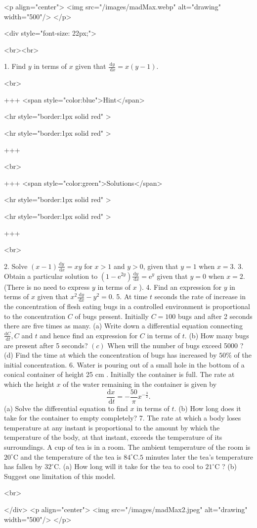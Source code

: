 <p align="center">
<img src="/images/madMax.webp" alt="drawing" width="500"/>
</p>

<div style="font-size: 22px;">

<br><br>

1. Find $y$ in terms of $x$ given that $\frac{\mathrm{d} y}{\mathrm{~d} x}=x(y-1)$.

<br>

+++ <span style="color:blue">Hint</span>

<hr style="border:1px solid red" >

<hr style="border:1px solid red" >

+++

<br>

+++ <span style="color:green">Solutions</span>

<hr style="border:1px solid red" >

<hr style="border:1px solid red" >

+++

<br>

2. Solve $(x-1) \frac{\mathrm{d} y}{\mathrm{~d} x}=x y$ for $x>1$ and $y>0$, given that $y=1$ when $x=3$.
3. Obtain a particular solution to $\left(1-\mathrm{e}^{2 y}\right) \frac{\mathrm{d} y}{\mathrm{~d} x}=\mathrm{e}^{y}$ given that $y=0$ when $x=2$.
(There is no need to express $y$ in terms of $x$ ).
4. Find an expression for $y$ in terms of $x$ given that $x^{2} \frac{\mathrm{~d} y}{\mathrm{~d} x}-y^{2}=0$.
5. At time $t$ seconds the rate of increase in the concentration of flesh eating bugs in a controlled environment is proportional to the concentration $C$ of bugs present. Initially $C=100$ bugs and after 2 seconds there are five times as many.
(a) Write down a differential equation connecting $\frac{\mathrm{d} C}{\mathrm{~d} t}, C$ and $t$ and hence find an expression for $C$ in terms of $t$.
(b) How many bugs are present after 5 seconds?
\((c)\) When will the number of bugs exceed 5000 ?
(d) Find the time at which the concentration of bugs has increased by $50 \%$ of the initial concentration.
6. Water is pouring out of a small hole in the bottom of a conical container of height 25 cm . Initially the container is full.
The rate at which the height $x$ of the water remaining in the container is given by
$$
\frac{\mathrm{d} x}{\mathrm{~d} t}=-\frac{50}{\pi} x^{-\frac{3}{2}} .
$$
(a) Solve the differential equation to find $x$ in terms of $t$.
(b) How long does it take for the container to empty completely?
7. The rate at which a body loses temperature at any instant is proportional to the amount by which the temperature of the body, at that instant, exceeds the temperature of its surroundings.
A cup of tea is in a room. The ambient temperature of the room is $20^{\circ} \mathrm{C}$ and the temperature of the tea is $84^{\circ} \mathrm{C} .5$ minutes later the tea's temperature has fallen by $32^{\circ} \mathrm{C}$.
(a) How long will it take for the tea to cool to $21^{\circ} \mathrm{C}$ ?
(b) Suggest one limitation of this model.

<br>

</div>
<p align="center">
<img src="/images/madMax2.jpeg" alt="drawing" width="500"/>
</p>
